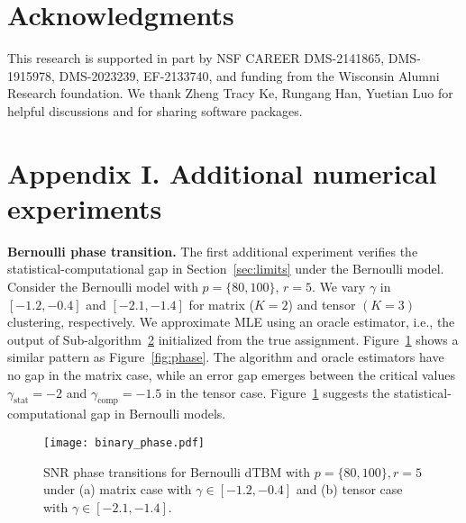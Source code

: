 \documentclass[lettersize,onecolumn,journal]{IEEEtran}
\theoremstyle{definition}
\theoremstyle{definition}
\begin{document}
\section*{Acknowledgments}
This research is supported in part by NSF CAREER DMS-2141865, DMS-1915978, DMS-2023239, EF-2133740, and funding from the Wisconsin Alumni Research foundation. We thank Zheng Tracy Ke, Rungang Han, Yuetian Luo for helpful discussions and for sharing software packages. 






\newpage
\appendix

{\color{blue}
\section*{Appendix I. Additional numerical experiments}
\textbf{Bernoulli phase transition.} The first additional experiment verifies the statistical-computational gap in Section~\ref{sec:limits} under the Bernoulli model. Consider the Bernoulli model with $p = \{80, 100\}$, $r = 5$. We vary $\gamma $ in $ [-1.2, -0.4]$ and $[-2.1, -1.4]$ for matrix ($K=2$) and tensor $(K = 3)$ clustering, respectively. We  approximate MLE using an oracle estimator, i.e., the output of Sub-algorithm~\hyperref[alg:main]{2} initialized from the true assignment. Figure~\ref{fig:phase_binary} shows a similar pattern as Figure~\ref{fig:phase}. The algorithm and oracle estimators have no gap in the matrix case, while an error gap emerges between the critical values $\gamma_{\text{stat}} = -2$ and $\gamma_{\text{comp}} = -1.5$ in the tensor case. Figure~\ref{fig:phase_binary} suggests the statistical-computational gap in Bernoulli models.

\begin{figure}[htb]
    \centering
    \texttt{[image: binary\_phase.pdf]}
    \caption{SNR phase transitions for Bernoulli dTBM with $p = \{80, 100\}, r = 5$ under (a) matrix case with $\gamma \in [-1.2, -0.4]$ and (b) tensor case with $ \gamma \in [-2.1, -1.4]$.}
    \label{fig:phase_binary}
\end{figure}

}
\end{document}

